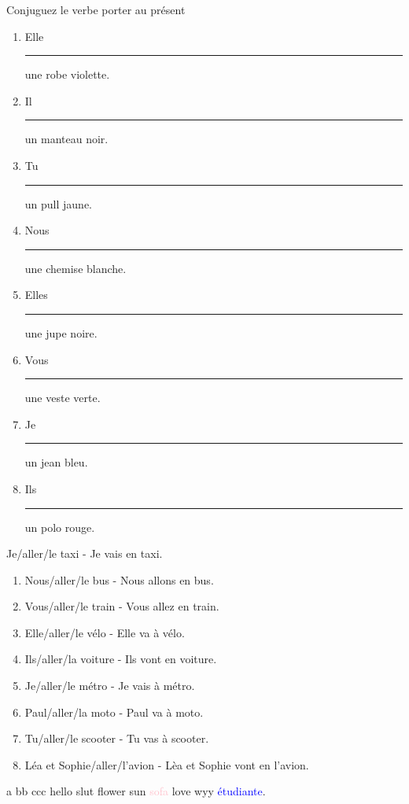 \documentclass[./templates/main.tex]{subfiles}
\begin{document}
\begin{practice}Conjuguez le verbe porter au présent
  \begin{enumerate}[label=(\arabic*)]
    \item Elle \rule{5em}{0.3mm} une robe violette.
    \item Il  \rule{5em}{0.3mm} un manteau noir.
    \item Tu  \rule{5em}{0.3mm} un pull jaune.
    \item Nous  \rule{5em}{0.3mm} une chemise blanche.
    \item Elles  \rule{5em}{0.3mm} une jupe noire.
    \item Vous  \rule{5em}{0.3mm} une veste verte.
    \item Je  \rule{5em}{0.3mm} un jean bleu.
    \item Ils  \rule{5em}{0.3mm} un polo rouge.
  \end{enumerate}
\end{practice}
\begin{practice}Je/aller/le taxi - Je vais en taxi.
  \begin{enumerate}[label=(\arabic*)]
    \item Nous/aller/le bus - Nous allons en bus.
    \item Vous/aller/le train - Vous allez en train.
    \item Elle/aller/le vélo - Elle va à vélo.
    \item Ils/aller/la voiture - Ils vont en voiture.
    \item Je/aller/le métro - Je vais à métro.
    \item Paul/aller/la moto - Paul va à moto.
    \item Tu/aller/le scooter - Tu vas à scooter.
    \item Léa et Sophie/aller/l’avion - Lèa et Sophie vont en l'avion.
  \end{enumerate}
\end{practice}
\begin{french}
  a bb ccc hello slut flower sun \textcolor{pink}{sofa} love wyy 
   \textcolor{blue}{étudiante}. 
\end{french}
\end{document}
